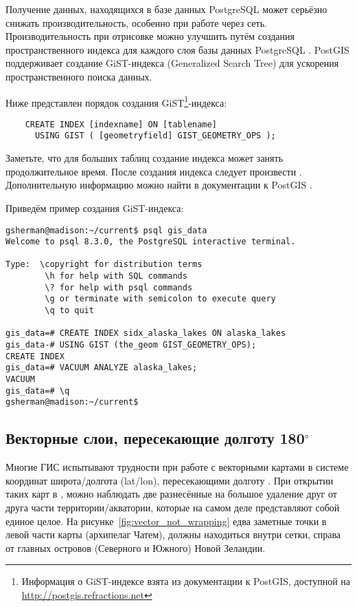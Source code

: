 Получение данных, находящихся в базе данных PostgreSQL может серьёзно
снижать производительность, особенно при работе через сеть. Производительность
при отрисовке можно улучшить путём создания пространственного индекса для
каждого слоя базы данных PostgreSQL .
PostGIS поддерживает создание  GiST-индекса
(Generalized Search Tree) для ускорения пространственного поиска данных.

Ниже представлен порядок создания GiST\footnote{Информация о GiST-индексе
взята из документации к PostGIS, доступной на
\url{http://postgis.refractions.net}}-индекса:

\begin{verbatim}
    CREATE INDEX [indexname] ON [tablename]
      USING GIST ( [geometryfield] GIST_GEOMETRY_OPS );
\end{verbatim}

Заметьте, что для больших таблиц создание индекса может занять
продолжительное время. После создания индекса следует произвести
. Дополнительную информацию можно найти в
документации к PostGIS \cite{PostGISweb}.

Приведём пример создания GiST-индекса:
\begin{verbatim}
gsherman@madison:~/current$ psql gis_data
Welcome to psql 8.3.0, the PostgreSQL interactive terminal.

Type:  \copyright for distribution terms
        \h for help with SQL commands
        \? for help with psql commands
        \g or terminate with semicolon to execute query
        \q to quit

gis_data=# CREATE INDEX sidx_alaska_lakes ON alaska_lakes
gis_data-# USING GIST (the_geom GIST_GEOMETRY_OPS);
CREATE INDEX
gis_data=# VACUUM ANALYZE alaska_lakes;
VACUUM
gis_data=# \q
gsherman@madison:~/current$
\end{verbatim}

\subsection{Векторные слои, пересекающие долготу 180$^\circ$}

Многие ГИС испытывают трудности при работе с векторными картами в системе
координат широта/долгота (lat/lon), пересекающими долготу .
При открытии таких карт в \qg, можно наблюдать две разнесённые на большое
удаление друг от друга части территории/акватории, которые на самом деле
представляют собой единое целое. На рисунке~\ref{fig:vector_not_wrapping}
едва заметные точки в левой части карты (архипелаг Чатем), должны
находиться внутри сетки, справа от главных островов (Северного и Южного)
Новой Зеландии.

